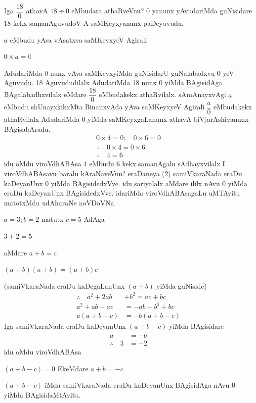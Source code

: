 Iga $\dfrac{18}{0}$ athavA $18\div 0$ eMbudara athaRveVnu? {\rm 0} yanunx yAvudariMda guNisidare {\rm 18} kekx samanAguvudoV A saMKeyxyanunx paDeyuvudu.

 $a$ eMbudu yAva vAsatxva saMKeyxyeV Agirali
\begin{center}
$0\times a=0$
\end{center}
AdudariMda {\rm 0} nunx yAva saMKeyxyiMda guNisidarU guNalabadxvu {\rm 0} yeV Aguvudu. {\rm 18} Aguvududilalx AdudariMda {\rm 18} nunx {\rm 0} yiMda BAgisidAga BAgalabadhxvilalx eMdare $\dfrac{18}{0}$ eMbudakekx athaRvilalx. sAmAnayxvAgi $a$ eMbudu shUnayxkikxMta BinanxvAda yAva saMKeyxyeV Agirali $\dfrac{a}{0}$ eMbudakekx athaRvilalx AdudariMda {\rm 0} yiMda  saMKeyxgaLanunx athavA biVjarAshiyanunx BAgisabAradu.
\begin{gather*}
0\times 4=0; \quad 0\times 6=0\tag{\rm 1}\\
\therefore \quad 0\times 4=0\times 6 \quad \tag{\rm 2}\\
\therefore \quad 4=6 \quad \tag{\rm 3}  
\end{gather*}
idu oMdu viroVdhABAsa {\rm 4} eMbudu {\rm 6} kekx samanAgalu sAdhayxvilalx\break 
I viroVdhABAsavu baralu kAraNaveVnu? eraDaneya {\rm (2)} samiVkaraNada eraDu kaDeyanUnx {\rm 0} yiMda BAgisidedxVve. idu sariyalalx aMdare ililx nAvu {\rm 0} yiMda eraDu kaDeyanUnx BAgisidedxVve. idariMda viroVdhABAsagaLu uMTAyitu matotxMdu udAharaNe noVDoVNa.
\begin{center}
$a=3 ; b=2$ \quad matutx \quad $c=5$ \quad AdAga

$3+2=5$

aMdare \quad $a+b=c$

$(a+b)(a+b)=(a+b)c$
\end{center}
(samiVkaraNada eraDu kaDegaLanUnx $(a+b)$ yiMda guNiside)
\begin{align*}
\therefore \quad a^2+2ab&+b^2=ac+bc\\
a^2+ab-ac&=-ab-b^2+bc\\
a(a+b-c)&=-b(a+b-c)
\end{align*}
Iga samiVkaraNada eraDu kaDeyanUnx $(a+b-c)$ yiMda BAgisidare
\begin{align*}
a&=-b\\
\therefore \quad 3&=-2
\end{align*}
idu oMdu viroVdhABAsa

$(a+b-c)=0$ \quad EkeMdare \quad $a+b=-c$

$(a+b-c)$ iMda samiVkaraNada eraDu kaDeyanUnx BAgisidAga nAvu {\rm 0} yiMda BAgisidaMtAyitu.

